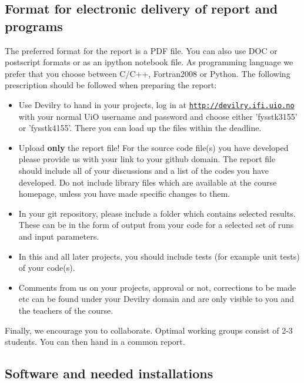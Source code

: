 \documentclass[%
oneside,                 %
final,                   %
10pt]{article}
\begin{document}
\noindent
\subsection*{Format for electronic delivery of report and programs}

The preferred format for the report is a PDF file. You can also use DOC or postscript formats or as an ipython notebook file.  As programming language we prefer that you choose between C/C++, Fortran2008 or Python. The following prescription should be followed when preparing the report:

\begin{itemize}
  \item Use Devilry to hand in your projects, log in  at  \href{{http://devilry.ifi.uio.no}}{\nolinkurl{http://devilry.ifi.uio.no}} with your normal UiO username and password and choose either 'fysstk3155' or 'fysstk4155'. There you can load up the files within the deadline.

  \item Upload \textbf{only} the report file!  For the source code file(s) you have developed please provide us with your link to your github domain.  The report file should include all of your discussions and a list of the codes you have developed.  Do not include library files which are available at the course homepage, unless you have made specific changes to them.

  \item In your git repository, please include a folder which contains selected results. These can be in the form of output from your code for a selected set of runs and input parameters.

  \item In this and all later projects, you should include tests (for example unit tests) of your code(s).

  \item Comments  from us on your projects, approval or not, corrections to be made  etc can be found under your Devilry domain and are only visible to you and the teachers of the course.
\end{itemize}

\noindent
Finally, 
we encourage you to collaborate. Optimal working groups consist of 
2-3 students. You can then hand in a common report. 



\subsection*{Software and needed installations}
\end{document}
